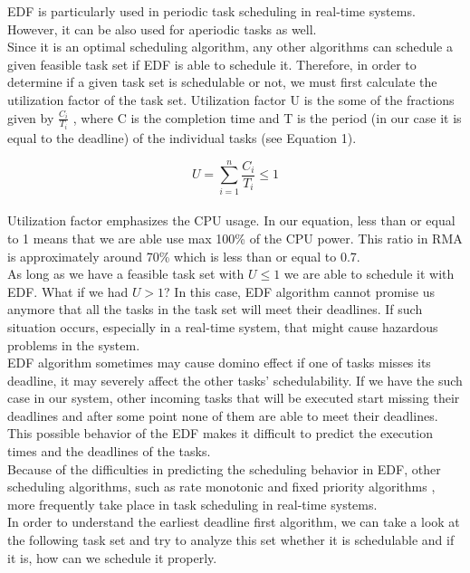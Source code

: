 \documentclass[conference]{IEEEtran}
\begin{document}
EDF is particularly used in periodic task scheduling in real-time systems. However, it can be also used for aperiodic tasks as well. \\

Since it is an optimal scheduling algorithm, any other algorithms can schedule a given feasible task set if EDF is able to schedule it. Therefore, in order to determine if a given task set is schedulable or not, we must first calculate the utilization factor of the task set. Utilization factor U is the some of the fractions given by \( \frac{C_i}{T_i} \) , where C is the completion time and T is the period (in our case it  is equal to the deadline) of the individual tasks (see Equation 1).  

\begin{equation}
    U = \sum_{i=1}^n \frac{C_i}{T_i} \leq 1
\end{equation} \cite{embart} \\

Utilization factor emphasizes the CPU usage. In our equation, less than or equal to 1 means that we are able use max 100\% of the CPU power. This ratio in RMA is approximately around 70\% which is less than or equal to 0.7. \\

As long as we have a feasible task set with \( U \leq 1 \) we are able to schedule it with EDF. What if we had \( U > 1 \)? In this case, EDF algorithm cannot promise us anymore that all the tasks in the task set will meet their deadlines. If such situation occurs, especially in a real-time system, that might cause hazardous problems in the system. \\

EDF algorithm sometimes may cause domino effect if one of tasks misses its deadline, it may severely affect the other tasks' schedulability. If we have the such case in our system, other incoming tasks that will be executed start missing their deadlines and after some point none of them are able to meet their deadlines. This possible behavior of the EDF makes it difficult to predict the execution times and the deadlines of the tasks.\\

Because of the difficulties in predicting the scheduling behavior in EDF, other scheduling algorithms, such as rate monotonic and fixed priority algorithms \cite{mic}, more frequently take place in task scheduling in real-time systems. \\

In order to understand the earliest deadline first algorithm, we can take a look at the following task set and try to analyze this set whether it is schedulable and if it is, how can we schedule it properly. \\
\end{document}
